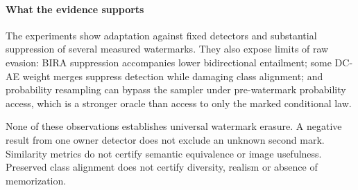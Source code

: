 \paragraph{What the evidence supports}
The experiments show adaptation against fixed detectors and substantial suppression of several measured watermarks. They also expose limits of raw evasion: BIRA suppression accompanies lower bidirectional entailment; some DC-AE weight merges suppress detection while damaging class alignment; and probability resampling can bypass the sampler under pre-watermark probability access, which is a stronger oracle than access to only the marked conditional law.

None of these observations establishes universal watermark erasure. A negative result from one owner detector does not exclude an unknown second mark. Similarity metrics do not certify semantic equivalence or image usefulness. Preserved class alignment does not certify diversity, realism or absence of memorization.

